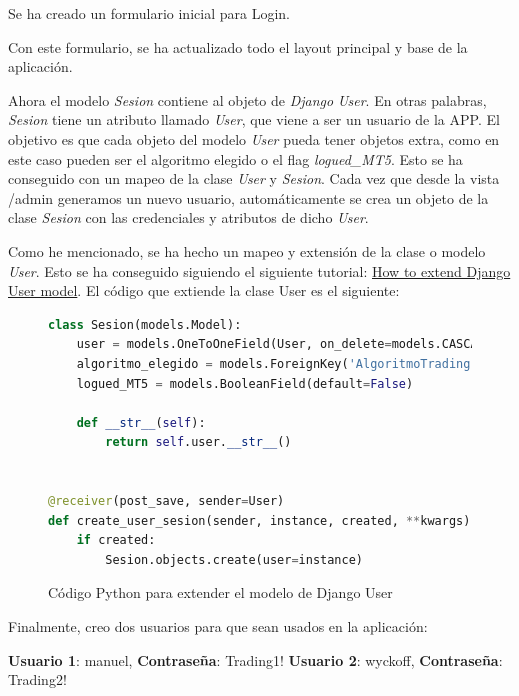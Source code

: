 Se ha creado un formulario inicial para Login. \newline

Con este formulario, se ha actualizado todo el layout principal y base de la aplicación.\newline

Ahora el modelo \textit{Sesion} contiene al objeto de \textit{Django} \textit{User}. En otras palabras, \textit{Sesion} tiene un atributo llamado \textit{User}, que viene a ser un usuario de la APP. El objetivo es que cada objeto del modelo \textit{User} pueda tener objetos extra, como en este caso pueden ser el algoritmo elegido o el flag \textit{logued\_MT5}. Esto se ha conseguido con un mapeo de la clase \textit{User} y \textit{Sesion}. Cada vez que desde la vista /admin generamos un nuevo usuario, automáticamente se crea un objeto de la clase \textit{Sesion} con las credenciales y atributos de dicho \textit{User}. \newline

Como he mencionado, se ha hecho un mapeo y extensión de la clase o modelo \textit{User}. Esto se ha conseguido siguiendo el siguiente tutorial: \href{https://simpleisbetterthancomplex.com/tutorial/2016/07/22/how-to-extend-django-user-model.html}{How to extend Django User model}. El código que extiende la clase User es el siguiente:\newline

\begin{figure}[h]
	\begin{lstlisting}[language=Python]
class Sesion(models.Model):
	user = models.OneToOneField(User, on_delete=models.CASCADE, null=True)
	algoritmo_elegido = models.ForeignKey('AlgoritmoTrading', on_delete=models.SET_NULL, null=True)
	logued_MT5 = models.BooleanField(default=False)

	def __str__(self):
		return self.user.__str__()


@receiver(post_save, sender=User)
def create_user_sesion(sender, instance, created, **kwargs):
	if created:
		Sesion.objects.create(user=instance)
	\end{lstlisting}
	\caption{Código Python para extender el modelo de Django User} \label{bandas_bollinger}
\end{figure}

Finalmente, creo dos usuarios para que sean usados en la aplicación:\newline

\textbf{Usuario 1}: manuel, \textbf{Contraseña}: Trading1!\newline
\textbf{Usuario 2}: wyckoff, \textbf{Contraseña}: Trading2!


